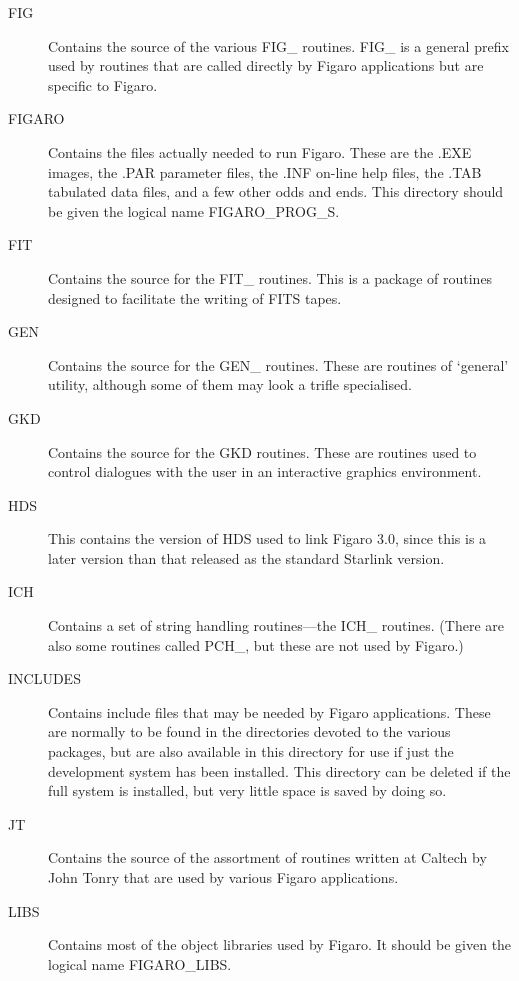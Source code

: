 \begin{description}

\item [FIG] Contains the source of the various FIG\_ routines. FIG\_ is
a general prefix used by routines that are called directly by Figaro
applications but are specific to Figaro.

\item [FIGARO] Contains the files actually needed to run Figaro. These
are the .EXE images, the .PAR parameter files, the .INF on-line help
files, the .TAB tabulated data files, and a few other odds and ends. This
directory should be given the logical name FIGARO\_PROG\_S.

\item [FIT] Contains the source for the FIT\_ routines. This is a package of
routines designed to facilitate the writing of FITS tapes.

\item [GEN] Contains the source for the GEN\_ routines. These are
routines of `general' utility, although some of them may look a trifle
specialised.

\item [GKD] Contains the source for the GKD routines. These are routines used
to control dialogues with the user in an interactive graphics environment.

\item [HDS] This contains the version of HDS used to link Figaro 3.0, since
this is a later version than that released as the standard Starlink version.

\item [ICH] Contains a set of string handling routines---the ICH\_ routines.
(There are also some routines called PCH\_, but these are not used by Figaro.)

\item [INCLUDES] Contains include files that may be needed by Figaro
applications. These are normally to be found in the directories devoted to
the various packages, but are also available in this directory for use if
just the development system has been installed. This directory can be
deleted if the full system is installed, but very little space is saved by
doing so.

\item [JT] Contains the source of the assortment of routines written at
Caltech by John Tonry that are used by various Figaro applications.

\item [LIBS] Contains most of the object libraries used by Figaro. It
should be given the logical name FIGARO\_LIBS.


\end{description}
